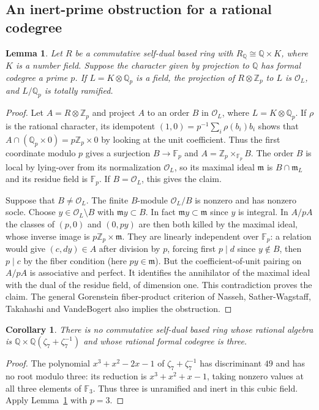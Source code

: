 \documentclass[11pt,a4paper]{article}
\newtheorem{lemma}[theorem]{Lemma}
\newtheorem{corollary}[theorem]{Corollary}
\theoremstyle{definition}\newtheorem{definition}[theorem]{Definition}
\theoremstyle{remark}\newtheorem{remark}[theorem]{Remark}
\newcommand{\Q}{\mathbb Q}
\newcommand{\ZZ}{\mathbb Z}
\numberwithin{equation}{section}
\begin{document}
\subsection{An inert-prime obstruction for a rational codegree}

\begin{lemma}\label{cub:lem:rational-prime-inert}
Let $R$ be a commutative self-dual based ring with
$R_{\Q}\cong\Q\times K$, where $K$ is a number field. Suppose the
character given by projection to $\Q$ has formal codegree a prime $p$.
If $L=K\otimes\Q_p$ is a field, the projection of $R\otimes\ZZ_p$
to $L$ is $\mathcal O_L$, and $L/\Q_p$ is totally ramified.
\end{lemma}
\begin{proof}
Let $A=R\otimes\ZZ_p$ and project $A$ to an order $B$ in
$\mathcal O_L$, where $L=K\otimes\Q_p$. If $\rho$ is the rational
character, its idempotent $(1,0)=p^{-1}\sum_i\rho(b_i)b_i$ shows that
$A\cap(\Q_p\times0)=p\ZZ_p\times0$ by looking at the unit coefficient.
Thus the first coordinate modulo $p$ gives a surjection $B\to\mathbb F_p$
and $A=\ZZ_p\times_{\mathbb F_p}B$. The order $B$ is local by
lying-over from its normalization $\mathcal O_L$, so its maximal ideal
$\mathfrak m$ is $B\cap\mathfrak m_L$ and its residue field is
$\mathbb F_p$. If $B=\mathcal O_L$, this gives the claim.

Suppose that $B\ne\mathcal O_L$. The finite $B$-module
$\mathcal O_L/B$ is nonzero and has nonzero socle.
Choose $y\in\mathcal O_L\setminus B$ with $\mathfrak m y\subset B$.
In fact $\mathfrak m y\subset\mathfrak m$ since $y$ is integral.
In $A/pA$ the classes of $(p,0)$ and $(0,py)$ are then both killed by
the maximal ideal, whose inverse image is $p\ZZ_p\times\mathfrak m$.
They are linearly independent over $\mathbb F_p$: a relation would give
$(c,dy)\in A$ after division by $p$, forcing first $p\mid d$ since
$y\notin B$, then $p\mid c$ by the fiber condition (here $py\in\mathfrak m$).
But the coefficient-of-unit pairing on $A/pA$ is associative and perfect.
It identifies the annihilator of the maximal ideal with the dual of the
residue field, of dimension one. This contradiction proves the claim.
The general Gorenstein fiber-product criterion of Nasseh, Sather-Wagstaff,
Takahashi and VandeBogert \cite[Fact~2.6 and Corollary~2.7]{NTV} also
implies the obstruction.
\end{proof}

\begin{corollary}\label{cub:cor:cubic-seven-three-impossible}
There is no commutative self-dual based ring whose rational algebra
is $\Q\times\Q(\zeta_7+\zeta_7^{-1})$ and whose
rational formal codegree is three.
\end{corollary}
\begin{proof}
The polynomial $x^3+x^2-2x-1$ of
$\zeta_7+\zeta_7^{-1}$ has discriminant $49$ and has no root
modulo three: its reduction is $x^3+x^2+x-1$, taking nonzero
values at all three elements of $\mathbb F_3$. Thus three is
unramified and inert in this cubic field. Apply
Lemma~\ref{cub:lem:rational-prime-inert} with $p=3$.
\end{proof}
\end{document}
